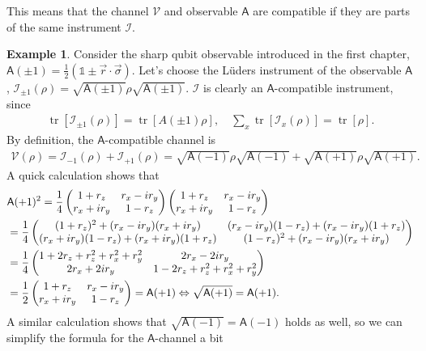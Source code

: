 \documentclass[a4paper,12pt]{wihuri}
\theoremstyle{definition}
\newtheorem{example}{Example}
\numberwithin{definition}{section}
\numberwithin{example}{section}
\numberwithin{theorem}{section}
\numberwithin{proposition}{section}
\numberwithin{lemma}{section}
\newcommand{\I}{\mathcal{I}}%
\newcommand{\V}{\mathcal{V}}%
\newcommand{\A}{\mathsf{A}}%
\newcommand{\id}{\mathds{1}}
\DeclareMathOperator{\tr}{tr}
\begin{document}
This means that the channel $\V$ and observable $\A$ are compatible if they are parts of the same instrument $\I$.
\begin{example}
Consider the sharp qubit observable introduced in the first chapter, $\A(\pm1) = \frac{1}{2}(\id \pm \vec{r}\cdot\vec{\sigma})$. Let's choose the Lüders instrument of the observable $\A$, $\I_{\pm1}(\rho) = \sqrt{\A(\pm1)}\rho\sqrt{\A(\pm1)}$. $\I$ is clearly an $\A$-compatible instrument, since
\begin{align*}
\tr[\I_{\pm1}(\rho)] = \tr[A(\pm1)\rho],\quad \sum_x\tr[\I_x(\rho)] = \tr[\rho]\text{.}
\end{align*}
By definition, the $\A$-compatible channel is 
\begin{align*}
\V(\rho) = \I_{-1}(\rho) + \I_{+1}(\rho) = \sqrt{\A(-1)} \rho \sqrt{\A(-1)} + \sqrt{\A(+1)} \rho \sqrt{\A(+1)}\text{.}
\end{align*}
A quick calculation shows that
\begin{align*}
&\A(+1)^2 = \dfrac{1}{4}
\begin{pmatrix}
1+r_z & r_x - ir_y \\
r_x + ir_y & 1-r_z
\end{pmatrix}
\begin{pmatrix}
1+r_z & r_x - ir_y \\
r_x + ir_y & 1-r_z
\end{pmatrix}\\
&= \dfrac{1}{4}
\begin{pmatrix}
(1+r_z)^2 + (r_x - ir_y)(r_x + ir_y) & (r_x-ir_y)(1-r_z) + (r_x-ir_y)(1+r_z)\\
(r_x+ir_y)(1-r_z) + (r_x+ir_y)(1+r_z) & (1-r_z)^2 + (r_x - ir_y)(r_x + ir_y)
\end{pmatrix}\\
&=\dfrac{1}{4}
\begin{pmatrix}
1+2r_z + r_z^2+r_x^2+r_y^2 & 2r_x-2ir_y \\
2r_x+2ir_y & 1-2r_z+r_z^2+r_x^2+r_y^2
\end{pmatrix}\\
&=\dfrac{1}{2}
\begin{pmatrix}
1+r_z & r_x-ir_y \\
r_x+ir_y & 1-r_z
\end{pmatrix} = \A(+1) \Leftrightarrow \sqrt{\A(+1)} = \A(+1)\text.
\end{align*}
A similar calculation shows that $\sqrt{\A(-1)} = \A(-1)$ holds as well, so we can simplify the formula for the $\A$-channel a bit

\end{example}
\end{document}
